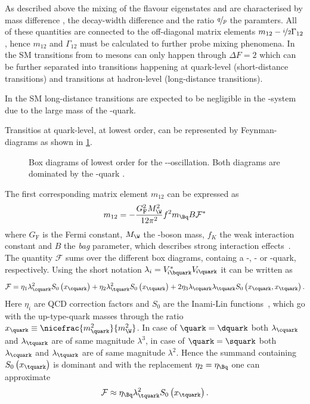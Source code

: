 As described above the mixing of the flavour eigenstates \Bq and \Bqb are characterised by mass difference \dm, the decay-width difference \DG and the ratio $\nicefrac{q}{p}$ the paramters.
All of these quantities are connected to the off-diagonal matrix elements $m_{12}-\nicefrac{i}{2}\Gamma_{12}$, hence $m_{12}$ and $\Gamma_{12}$ must be calculated to further probe mixing phenomena.
In the \ac{SM} transitions from \Bq to \Bqb mesons can only happen through $\Delta F=2$ which can be further separated into transitions happening at quark-level (short-distance transitions) and transitions at hadron-level (long-distance transitions).

In the \ac{SM} long-distance transitions are expected to be negligible in the \Bq-\Bqb system due to the large mass of the \bquark-quark.

Transitios at quark-level, at lowest order, can be represented by Feynman-diagrams as shown in \cref{fig:FeynmanMixing}.
\begin{figure}[tbp]
	\centering
	
	\hspace{0.5cm}
	
	\caption{Box diagrams of lowest order for the \Bz-\Bzb-oscillation. Both diagrams are dominated by the \tquark-quark \cite{Ellis:2016jkw}.}
	\label{fig:FeynmanMixing}
\end{figure}
The first corresponding matrix element $m_{12}$ can be expressed as
\begin{equation}
m_{12}=-\frac{G_{\text{F}}^2M_\W^2}{12\pi^2}f^2m_{\Bq}B\mathcal{F}^\ast \label{eq:monetwo}
\end{equation}
where $G_{\text{F}}$ is the Fermi constant, $M_\W$ the \W-boson mass, $f_K$ the weak interaction constant and $B$ the \emph{bag} parameter, which describes strong interaction effects~\cite{Branco:396964}.
The quantity $\mathcal{F}$ sums over the different box diagrams, containg a \uquark-, \cquark- or \tquark-quark, respectively.
Using the short notation $\lambda_i=V^{*}_{{\kern -0.1em}i\bquark}V_{{\kern -0.1em}i\quark}$ it can be written as
\begin{equation}
\mathcal{F}=\eta_1\lambda_\cquark^2S_0\left(x_\cquark\right)+\eta_2\lambda_\tquark^2S_0\left(x_\tquark\right)
+2\eta_3\lambda_{\cquark}\lambda_{\tquark}S_0\left(x_\cquark,x_\tquark\right).
\end{equation}
Here $\eta_i$ are QCD correction factors and $S_0$ are the Inami-Lin functions~\cite{Inami:1980fz}, which go with the up-type-quark masses through the ratio $x_\quark\equiv\nicefrac{m_\quark^2}{m_\W^2}$.
In case of $\quark=\dquark$ both $\lambda_\cquark$ and $\lambda_\tquark$ are of same magnitude $\lambda^3$, in case of $\quark=\squark$ both $\lambda_\cquark$ and $\lambda_\tquark$ are of same magnitude $\lambda^2$.
Hence the summand containing $S_0\left(x_\tquark\right)$ is dominant and with the replacement $\eta_2=\eta_\Bq$ one can approximate
\begin{equation}
\mathcal{F}\approx\eta_\Bq\lambda_\tquark^2S_0\left(x_\tquark\right).
\end{equation}

